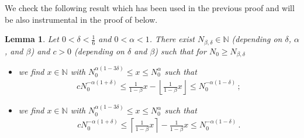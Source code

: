 \documentclass[reqno]{amsart}
\theoremstyle{plain}
\newtheorem{lemma}[theorem]{Lemma}
\theoremstyle{definition}
\numberwithin{equation}{section}
\newcommand{\N}{\mathbb{N}}
\begin{document}
We check the following result which has been used in the previous proof and will be also instrumental in the proof of   below.  

\begin{lemma}\label{lemma:discr}
Let $0<\delta<\frac{1}{6}$ and $0<\alpha < 1$. There exist $ N_{\beta,\delta}  \in \N$  (depending on $\delta$,  $\alpha$, and $\beta$) and $c>0$ (depending on $\delta$ and $\beta$) such that for $N_0 \ge N_{\beta,\delta}  $ 
\begin{itemize}
\item[(i)]  we find   $x \in  \N $ with  $N_0^{\alpha(1-3\delta)} \le x \le N_0^\alpha$ such that 
\begin{align}\label{XXX}
 c N_0^{-\alpha(1+\delta)} \leq  \frac{1}{1-\beta }    x - \left\lfloor  \frac{1}{1-\beta }    x \right\rfloor  \le N_0^{-\alpha (1-\delta)}\,;
\end{align}
\item[(ii)]  we find   $x \in  \N $ with  $N_0^{\alpha(1-3\delta)} \le x \le N_0^\alpha$ such that 
\begin{align*}
 c N_0^{-\alpha(1+\delta)} \leq \left\lceil  \frac{1}{1-\beta }    x \right\rceil -  \frac{1}{1-\beta }   x  \le N_0^{-\alpha (1-\delta)}\,.
\end{align*}

\end{itemize}



\end{lemma}
\end{document}

